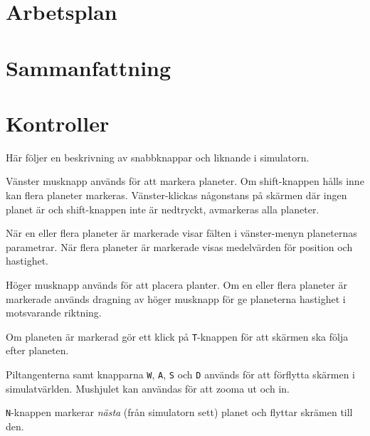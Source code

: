 \documentclass[a4paper, 11pt]{article}
\begin{document}
\section{Arbetsplan}
\label{sec:arbplan}

\vspace{12pt}

\vspace{12pt}


\section{Sammanfattning}

\section{Kontroller} %

Här följer en beskrivning av snabbknappar och liknande i simulatorn.

Vänster musknapp används för att markera planeter.
Om shift-knappen hålls inne kan flera planeter markeras.
Vänster-klickas någonstans på skärmen där ingen planet är
och shift-knappen inte är nedtryckt, avmarkeras alla planeter.

När en eller flera planeter är markerade visar fälten i vänster-menyn
planeternas parametrar.
När flera planeter är markerade visas medelvärden för position
och hastighet.

Höger musknapp används för att placera planter.
Om en eller flera planeter är markerade används dragning av höger musknapp
för ge planeterna hastighet i motsvarande riktning.

Om planeten är markerad gör ett klick på \verb#T#-knappen för att
skärmen ska följa efter planeten.

Piltangenterna samt knapparna \verb#W#, \verb#A#, \verb#S# och \verb#D#
används för att förflytta skärmen i simulatvärlden.
Mushjulet kan användas för att zooma ut och in.

\verb#N#-knappen markerar \textit{nästa} (från simulatorn sett)
planet och flyttar skrämen till den.
\end{document}
